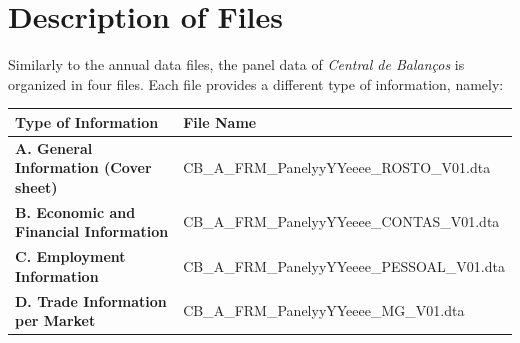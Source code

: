\documentclass[]{book}
\begin{document}
\hypertarget{description-of-files}{%
\chapter{Description of Files}\label{description-of-files}}

Similarly to the annual data files, the panel data of \emph{Central de Balanços} is organized in four files. Each file provides a different type of information, namely:

\begin{longtable}[]{@{}ll@{}}
\toprule
\begin{minipage}[b]{0.35\columnwidth}\raggedright
Type of Information\strut
\end{minipage} & \begin{minipage}[b]{0.59\columnwidth}\raggedright
File Name\strut
\end{minipage}\tabularnewline
\midrule
\endhead
\begin{minipage}[t]{0.35\columnwidth}\raggedright
\textbf{A. General Information (Cover sheet)}\strut
\end{minipage} & \begin{minipage}[t]{0.59\columnwidth}\raggedright
CB\_A\_FRM\_PanelyyYYeeee\_ROSTO\_V01.dta\strut
\end{minipage}\tabularnewline
\begin{minipage}[t]{0.35\columnwidth}\raggedright
\textbf{B. Economic and Financial Information}\strut
\end{minipage} & \begin{minipage}[t]{0.59\columnwidth}\raggedright
CB\_A\_FRM\_PanelyyYYeeee\_CONTAS\_V01.dta\strut
\end{minipage}\tabularnewline
\begin{minipage}[t]{0.35\columnwidth}\raggedright
\textbf{C. Employment Information}\strut
\end{minipage} & \begin{minipage}[t]{0.59\columnwidth}\raggedright
CB\_A\_FRM\_PanelyyYYeeee\_PESSOAL\_V01.dta\strut
\end{minipage}\tabularnewline
\begin{minipage}[t]{0.35\columnwidth}\raggedright
\textbf{D. Trade Information per Market}\strut
\end{minipage} & \begin{minipage}[t]{0.59\columnwidth}\raggedright
CB\_A\_FRM\_PanelyyYYeeee\_MG\_V01.dta\strut
\end{minipage}\tabularnewline
\bottomrule
\end{longtable}
\end{document}
